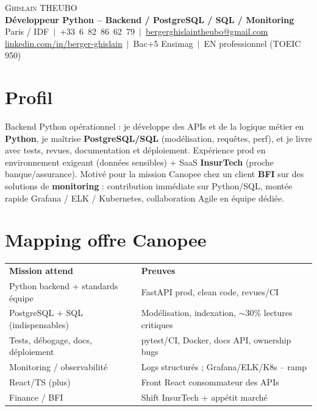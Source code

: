 \documentclass[a4paper,10.5pt]{article}
\begin{document}
\begin{center}
{\Huge \scshape Ghislain THEUBO}\\[2pt]
\textbf{D\'eveloppeur Python -- Backend / PostgreSQL / SQL / Monitoring}\\[2pt]
\small Paris / IDF $\,|\,$ +33~6~82~86~62~79 $\,|\,$ \href{mailto:bergerghislaintheubo@gmail.com}{bergerghislaintheubo@gmail.com}\\[1pt]
\href{https://www.linkedin.com/in/berger-ghislain}{linkedin.com/in/berger-ghislain} $\,|\,$ Bac+5 Ensimag $\,|\,$ EN professionnel (TOEIC 950)
\end{center}

\section{Profil}
\small{
Backend Python op\'erationnel : je d\'eveloppe des APIs et de la logique m\'etier en \textbf{Python},
je ma\^itrise \textbf{PostgreSQL/SQL} (mod\'elisation, requ\^etes, perf), et je livre avec tests,
revues, documentation et d\'eploiement. Exp\'erience prod en environnement exigeant (donn\'ees sensibles)
+ SaaS \textbf{InsurTech} (proche banque/assurance). Motiv\'e pour la mission Canopee chez un client
\textbf{BFI} sur des solutions de \textbf{monitoring} : contribution imm\'ediate sur Python/SQL,
mont\'ee rapide Grafana / ELK / Kubernetes, collaboration Agile en \'equipe d\'edi\'ee.
}

\section{Mapping offre Canopee}
\small{
\begin{tabular*}{0.97\textwidth}{@{}p{}@{\extracolsep{\fill}}p{}@{}}
\textbf{Mission attend} & \textbf{Preuves} \\
Python backend + standards \'equipe & FastAPI prod, clean code, revues/CI \\
PostgreSQL + SQL (indispensables) & Mod\'elisation, indexation, $\sim$30\% lectures critiques \\
Tests, d\'ebogage, docs, d\'eploiement & pytest/CI, Docker, docs API, ownership bugs \\
Monitoring / observabilit\'e & Logs structur\'es ; Grafana/ELK/K8s -- ramp \\
React/TS (plus) & Front React consommateur des APIs \\
Finance / BFI & Shift InsurTech + app\'etit march\'e \\
\end{tabular*}
}
\end{document}
